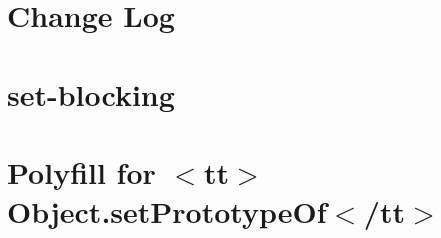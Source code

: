 \documentclass[twoside]{book}
\newcommand{\+}{\discretionary{\mbox{\scriptsize$\hookleftarrow$}}{}{}}
\begin{document}
\chapter{Change Log}
\label{md__c___users_vaishnavi_jadhav__desktop__developer_code_mean_stack_example_client_node_modules_set_blocking__c_h_a_n_g_e_l_o_g}

\chapter{set-\/blocking}
\label{md__c___users_vaishnavi_jadhav__desktop__developer_code_mean_stack_example_client_node_modules_set_blocking__r_e_a_d_m_e}

\chapter{Polyfill for \texorpdfstring{$<$}{<}tt\texorpdfstring{$>$}{>}Object.\+set\+Prototype\+Of\texorpdfstring{$<$}{<}/tt\texorpdfstring{$>$}{>}}
\label{md__c___users_vaishnavi_jadhav__desktop__developer_code_mean_stack_example_client_node_modules_setprototypeof__r_e_a_d_m_e}

\end{document}

